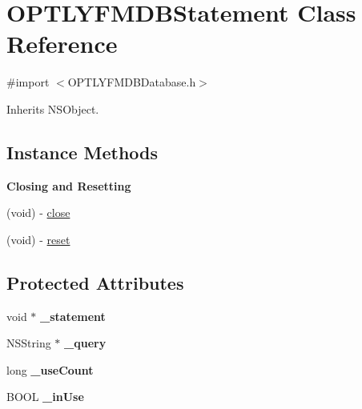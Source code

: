 \hypertarget{interface_o_p_t_l_y_f_m_d_b_statement}{}\section{O\+P\+T\+L\+Y\+F\+M\+D\+B\+Statement Class Reference}
\label{interface_o_p_t_l_y_f_m_d_b_statement}


{\ttfamily \#import $<$O\+P\+T\+L\+Y\+F\+M\+D\+B\+Database.\+h$>$}



Inherits N\+S\+Object.

\subsection*{Instance Methods}
\begin{Indent}\textbf{ Closing and Resetting}\par
{\em 

 

 }\begin{DoxyCompactItemize}
\item 
(void) -\/ \mbox{\hyperlink{interface_o_p_t_l_y_f_m_d_b_statement_a64f8208aeac1c0ab804673c360b5fd5d}{close}}
\item 
(void) -\/ \mbox{\hyperlink{interface_o_p_t_l_y_f_m_d_b_statement_a2dcd78fdd876271a736127bb5d339e04}{reset}}
\end{DoxyCompactItemize}
\end{Indent}
\subsection*{Protected Attributes}
\begin{DoxyCompactItemize}
\item 
\mbox{\label{interface_o_p_t_l_y_f_m_d_b_statement_af7eb82bda0fcf9f357601e228869cc21}} 
void $\ast$ {\bfseries \+\_\+statement}
\item 
\mbox{\label{interface_o_p_t_l_y_f_m_d_b_statement_af276596d0bc3d3c5962ded46b92d1ec4}} 
N\+S\+String $\ast$ {\bfseries \+\_\+query}
\item 
\mbox{\label{interface_o_p_t_l_y_f_m_d_b_statement_a59c032163a80ad8f9777ea606c8ed1c6}} 
long {\bfseries \+\_\+use\+Count}
\item 
\mbox{\label{interface_o_p_t_l_y_f_m_d_b_statement_a51c60ad168cd78f72fd93952ec256e78}} 
B\+O\+OL {\bfseries \+\_\+in\+Use}
\end{DoxyCompactItemize}

